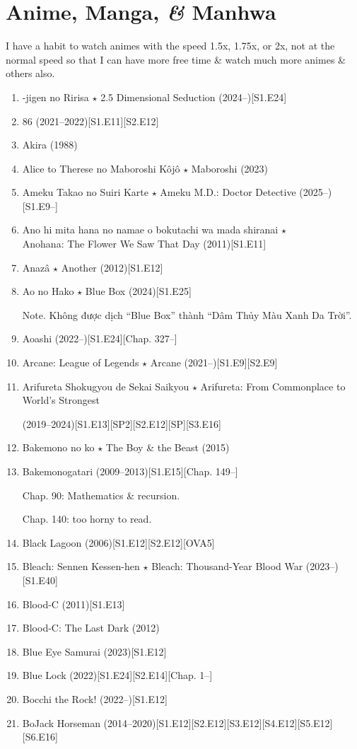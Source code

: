 \documentclass{article}
\begin{document}
\section{Anime, Manga, {\it\&} Manhwa}
I have a habit to watch animes with the speed 1.5x, 1.75x, or 2x, not at the normal speed so that I can have more free time \& watch much more animes \& others also.
\begin{enumerate}
	\item {-jigen no Ririsa $\star$ 2.5 Dimensional Seduction} (2024--)\hfill[S1.E24]
	\item 86 (2021--2022)\hfill[S1.E11][S2.E12]
    \item {\sc Akira} (1988)
    \item {\sc Alice to Therese no Maboroshi Kôjô $\star$ Maboroshi} (2023)
    \item Ameku Takao no Suiri Karte $\star$ Ameku M.D.: Doctor Detective (2025--)\hfill[S1.E9--]
    \item {\sc Ano hi mita hana no namae o bokutachi wa mada shiranai $\star$\\Anohana: The Flower We Saw That Day} (2011)\hfill[S1.E11]
    \item {\sc Anazâ $\star$ Another} (2012)\hfill[S1.E12]
    \item {\sc Ao no Hako $\star$ Blue Box} (2024)\hfill[S1.E25]
    
    {\sf Note.} Không được dịch ``Blue Box'' thành ``Dâm Thủy Màu Xanh Da Trời''.
    \item Aoashi (2022--)\hfill[S1.E24][Chap. 327--]
        
    \item {\sc Arcane: League of Legends $\star$ Arcane} (2021--)\hfill[S1.E9][S2.E9]
    \item {\sc Arifureta Shokugyou de Sekai Saikyou $\star$ Arifureta: From Commonplace to World's Strongest}
    
    (2019--2024)\hfill[S1.E13][SP2][S2.E12][SP][S3.E16]
    \item {\sc Bakemono no ko $\star$ The Boy \& the Beast} (2015)
    \item {\sc Bakemonogatari} (2009--2013)\hfill[S1.E15][Chap. 149--]
    
    Chap. 90: Mathematics \& recursion.
    
    Chap. 140: too horny to read.
    \item {\sc Black Lagoon} (2006)\hfill[S1.E12][S2.E12][OVA5]
    \item {\sc Bleach: Sennen Kessen-hen $\star$ Bleach: Thousand-Year Blood War} (2023--)\hfill[S1.E40]
    \item {\sc Blood-C} (2011)\hfill[S1.E13]
    \item Blood-C: The Last Dark (2012)
    \item {\sc Blue Eye Samurai} (2023)\hfill[S1.E12]
    \item {\sc Blue Lock} (2022)\hfill[S1.E24][S2.E14][Chap. 1--]
    \item Bocchi the Rock! (2022--)\hfill[S1.E12]
    \item {\sc BoJack Horseman} (2014--2020)\hfill[S1.E12][S2.E12][S3.E12][S4.E12][S5.E12][S6.E16]
    

\end{enumerate}
\end{document}
